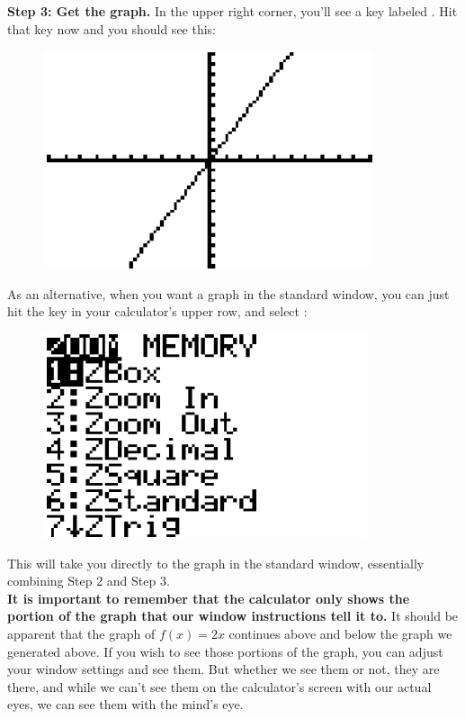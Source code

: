 \textbf{Step 3: Get the graph.} In the upper right corner, you’ll see a key labeled . Hit that key now and you should see this:

\begin{figure}[H]
	\centering
	\includegraphics[scale=1.0]{Sections/FunctionsandGraphsImages/Figure22.png}
\end{figure}

 As an alternative, when you want a graph in the standard window, you can just hit the  key in your calculator’s upper row, and select :

\begin{figure}[H]
	\centering
	\includegraphics[scale=1.0]{Sections/FunctionsandGraphsImages/Figure23.png}
\end{figure}

This will take you directly to the graph in the standard window, essentially combining Step 2 and Step 3.\\

\textbf{It is important to remember that the calculator only shows the portion of the graph that our window instructions tell it to.} It should be apparent that the graph of $f(x)=2x$ continues above and below the graph we generated above. If you wish to see those portions of the graph, you can adjust your window settings and see them. But whether we see them or not, they are there, and while we can’t see them on the calculator’s screen with our actual eyes, we can see them with the mind’s eye. \\

